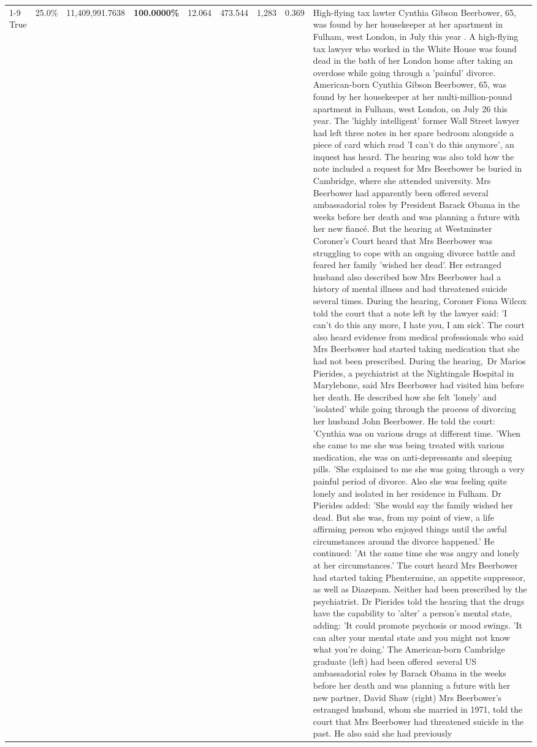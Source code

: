 \begin{table}[H]
\begin{tabular}{lllrlllll}
\cline{1-9}
True & 25.0\% & 11,409,991.7638 & \bfseries \color{red} 100.0000\% & 12.064 & 473.544 & 1,283 & 0.369 & High-flying tax lawter Cynthia Gibson Beerbower, 65, was found by her housekeeper at her apartment in Fulham, west London, in July this year . A high-flying tax lawyer who worked in the White House was found dead in the bath of her London home after taking an overdose while going through a 'painful' divorce. American-born Cynthia Gibson Beerbower, 65, was found by her housekeeper at her multi-million-pound apartment in Fulham, west London, on July 26 this year. The 'highly intelligent' former Wall Street lawyer had left three notes in her spare bedroom alongside a piece of card which read 'I can't do this anymore', an inquest has heard. The hearing was also told how the note included a request for Mrs Beerbower be buried in Cambridge, where she attended university. Mrs Beerbower had apparently been offered several ambassadorial roles by President Barack Obama in the weeks before her death and was planning a future with her new fiancé. But the hearing at Westminster Coroner's Court heard that Mrs Beerbower was struggling to cope with an ongoing divorce battle and feared her family 'wished her dead'. Her estranged husband also described how Mrs Beerbower had a history of mental illness and had threatened suicide several times. During the hearing, Coroner Fiona Wilcox told the court that a note left by the lawyer said: 'I can't do this any more, I hate you, I am sick'. The court also heard evidence from medical professionals who said Mrs Beerbower had started taking medication that she had not been prescribed. During the hearing, Dr Marios Pierides, a psychiatrist at the Nightingale Hospital in Marylebone, said Mrs Beerbower had visited him before her death. He described how she felt 'lonely' and 'isolated' while going through the process of divorcing her husband John Beerbower. He told the court: 'Cynthia was on various drugs at different time. 'When she came to me she was being treated with various medication, she was on anti-depressants and sleeping pills. 'She explained to me she was going through a very painful period of divorce. Also she was feeling quite lonely and isolated in her residence in Fulham. Dr Pierides added: 'She would say the family wished her dead. But she was, from my point of view, a life affirming person who enjoyed things until the awful circumstances around the divorce happened.' He continued: 'At the same time she was angry and lonely at her circumstances.' The court heard Mrs Beerbower had started taking Phentermine, an appetite suppressor, as well as Diazepam. Neither had been prescribed by the psychiatrist. Dr Pierides told the hearing that the drugs have the capability to 'alter' a person's mental state, adding: 'It could promote psychosis or mood swings. 'It can alter your mental state and you might not know what you're doing.' The American-born Cambridge graduate (left) had been offered several US ambassadorial roles by Barack Obama in the weeks before her death and was planning a future with her new partner, David Shaw (right) Mrs Beerbower's estranged husband, whom she married in 1971, told the court that Mrs Beerbower had threatened suicide in the past. He also said she had previously 
\end{tabular}
\end{table}
